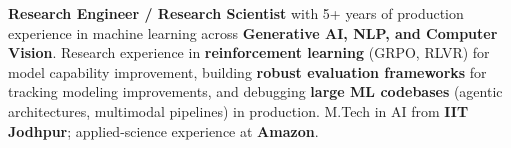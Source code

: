 \documentclass[letter,10pt]{article}
\begin{document}

\textbf{Research Engineer / Research Scientist} with 5+ years of production experience in machine learning across \textbf{Generative AI, NLP, and Computer Vision}.
Research experience in \textbf{reinforcement learning} (GRPO, RLVR) for model capability improvement, building \textbf{robust evaluation frameworks} for tracking modeling improvements, and debugging \textbf{large ML codebases} (agentic architectures, multimodal pipelines) in production.
M.Tech in AI from \textbf{IIT Jodhpur}; applied-science experience at \textbf{Amazon}.
\end{document}
